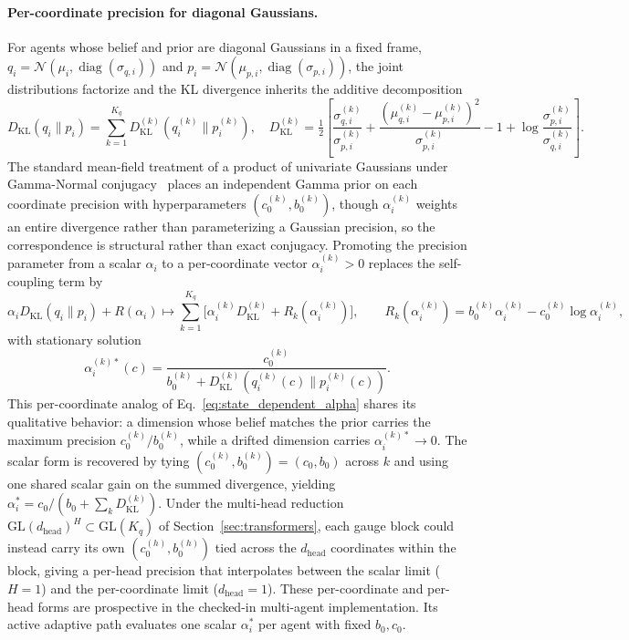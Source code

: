 \documentclass[11pt]{article}
\begin{document}
\paragraph{Per-coordinate precision for diagonal Gaussians.}
\label{par:per_coord_alpha}
For agents whose belief and prior are diagonal Gaussians in a fixed frame, $q_i = \mathcal{N}(\mu_i, \operatorname{diag}(\sigma_{q,i}))$ and $p_i = \mathcal{N}(\mu_{p,i}, \operatorname{diag}(\sigma_{p,i}))$, the joint distributions factorize and the KL divergence inherits the additive decomposition
\begin{equation}
D_{\mathrm{KL}}(q_i \| p_i) = \sum_{k=1}^{K_q} D_{\mathrm{KL}}^{(k)}(q_i^{(k)} \| p_i^{(k)}),
\quad
D_{\mathrm{KL}}^{(k)} = \tfrac{1}{2}\left[ \frac{\sigma_{q,i}^{(k)}}{\sigma_{p,i}^{(k)}} + \frac{(\mu_{q,i}^{(k)} - \mu_{p,i}^{(k)})^2}{\sigma_{p,i}^{(k)}} - 1 + \log \frac{\sigma_{p,i}^{(k)}}{\sigma_{q,i}^{(k)}} \right].
\label{eq:kl_decomposition_per_coord}
\end{equation}
The standard mean-field treatment of a product of univariate Gaussians under Gamma-Normal conjugacy~\cite[\S 10.1.3, \S 2.3.6]{Bishop2006} places an independent Gamma prior on each coordinate precision with hyperparameters $(c_0^{(k)}, b_0^{(k)})$, though $\alpha_i^{(k)}$ weights an entire divergence rather than parameterizing a Gaussian precision, so the correspondence is structural rather than exact conjugacy. Promoting the precision parameter from a scalar $\alpha_i$ to a per-coordinate vector $\alpha_i^{(k)} > 0$ replaces the self-coupling term by
\begin{equation}
\alpha_i  D_{\mathrm{KL}}(q_i \| p_i) + R(\alpha_i)
\longmapsto
\sum_{k=1}^{K_q} \Big[\alpha_i^{(k)} D_{\mathrm{KL}}^{(k)} + R_k(\alpha_i^{(k)})\Big],
\qquad
R_k(\alpha_i^{(k)}) = b_0^{(k)} \alpha_i^{(k)} - c_0^{(k)} \log \alpha_i^{(k)},
\label{eq:adaptive_self_coupling_per_coord}
\end{equation}
with stationary solution
\begin{equation}
\boxed{
\alpha_i^{(k)*}(c) = \frac{c_0^{(k)}}{b_0^{(k)} + D_{\mathrm{KL}}^{(k)}(q_i^{(k)}(c) \| p_i^{(k)}(c))}.
}
\label{eq:state_dependent_alpha_per_coord}
\end{equation}
This per-coordinate analog of Eq.~\eqref{eq:state_dependent_alpha} shares its qualitative behavior: a dimension whose belief matches the prior carries the maximum precision $c_0^{(k)}/b_0^{(k)}$, while a drifted dimension carries $\alpha_i^{(k)*} \to 0$. The scalar form is recovered by tying $(c_0^{(k)}, b_0^{(k)}) = (c_0, b_0)$ across $k$ and using one shared scalar gain on the summed divergence, yielding $\alpha_i^* = c_0 / (b_0 + \sum_k D_{\mathrm{KL}}^{(k)})$. Under the multi-head reduction $\mathrm{GL}(d_{\text{head}})^H \subset \mathrm{GL}(K_q)$ of Section~\ref{sec:transformers}, each gauge block could instead carry its own $(c_0^{(h)}, b_0^{(h)})$ tied across the $d_{\text{head}}$ coordinates within the block, giving a per-head precision that interpolates between the scalar limit ($H = 1$) and the per-coordinate limit ($d_{\text{head}} = 1$). These per-coordinate and per-head forms are prospective in the checked-in multi-agent implementation. Its active adaptive path evaluates one scalar $\alpha_i^*$ per agent with fixed $b_0,c_0$.
\end{document}
